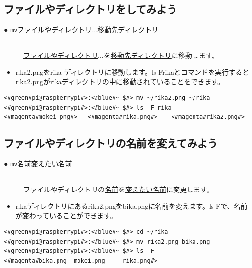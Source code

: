 \newpage
\subsection{ファイルやディレクトリをしてみよう}
\begin{description}
\item[● \texttt{mv}\textvisiblespace \underline{ファイルやディレクトリ}$\ldots$\textvisiblespace \underline{移動先ディレクトリ}]\mbox{}\\
\underline{ファイルやディレクトリ}$\ldots$を\underline{移動先ディレクトリ}に移動します。
\end{description}
\begin{itemize}
\item[<例>]rika2.pngをrika ディレクトリに移動します。ls\textvisiblespace -F\textvisiblespace rikaとコマンドを実行するとrika2.pngがrikaディレクトリの中に移動されていることをできます。
\end{itemize}
\begin{lstlisting}[caption=mvの例, label=mv]
<#green#pi@raspberrypi#>:<#blue#~ $#> mv ~/rika2.png ~/rika
<#green#pi@raspberrypi#>:<#blue#~ $#> ls -F rika
<#magenta#mokei.png#>	<#magenta#rika.png#>	<#magenta#rika2.png#>
\end{lstlisting}


\subsection{ファイルやディレクトリの名前を変えてみよう}
\begin{description}
\item[● \texttt{mv}\textvisiblespace \underline{名前}\textvisiblespace \underline{変えたい名前}]\mbox{}\\
ファイルやディレクトリの\underline{名前}を\underline{変えたい名前}に変更します。
\end{description}
\begin{itemize}
\item[<例>]rikaディレクトリにあるrika2.pngをbika.pngに名前を変えます。ls\textvisiblespace -Fで、名前が変わっていることができます。
\end{itemize}
\begin{lstlisting}[caption=ファイル名を変える, label=mvName]
<#green#pi@raspberrypi#>:<#blue#~ $#> cd ~/rika
<#green#pi@raspberrypi#>:<#blue#~ $#> mv rika2.png bika.png
<#green#pi@raspberrypi#>:<#blue#~ $#> ls -F
<#magenta#bika.png	mokei.png     rika.png#>
\end{lstlisting}

